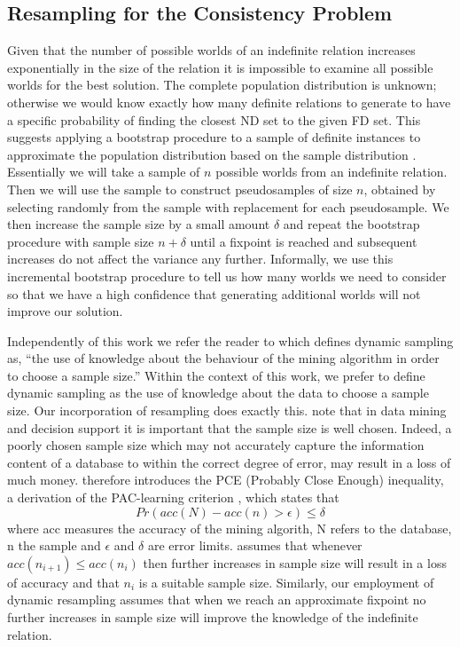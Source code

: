 \subsection{Resampling for the Consistency Problem}

Given that the number of  possible worlds of an indefinite relation increases
exponentially in the size of the relation  it is impossible to
examine all possible worlds for the best solution.  The
complete population distribution is unknown; otherwise we would know 
exactly how many definite relations to
generate to have a specific probability of finding the closest ND set
to the given FD set.  This suggests 
applying a bootstrap procedure to a sample of definite instances 
to approximate the population distribution based on the sample
distribution \cite{et86}.  Essentially we will take a sample of
$n$ possible
worlds from an indefinite relation. Then we will use the sample
to construct pseudosamples of size $n$, obtained by selecting
randomly from the sample with replacement for each pseudosample. 
We then increase the sample size by a small amount $\delta$ and repeat
the bootstrap procedure with sample size $n + \delta$ until a fixpoint
is reached and subsequent increases do not affect the variance any further.
Informally, we use this incremental
bootstrap procedure to tell us how many worlds we need 
to consider so that we have a high confidence that generating additional
worlds will not improve our solution.

\medskip

Independently of this work we refer the reader to \cite{jl96} which
defines dynamic sampling as, ``the use of knowledge about the
behaviour of the mining algorithm in order to choose a sample size.''
Within the context of this work, we prefer to define dynamic sampling
as the use of knowledge about the data to choose a sample size. Our
incorporation of resampling does exactly this.
\cite{jl96} note that in data mining and decision support it is
important that the sample size is well chosen.  Indeed, a poorly
chosen sample size which may not accurately capture the information
content of a database to within the correct degree of error, may
result in a loss of much money. \cite{jl96} therefore introduces the
PCE (Probably Close Enough) inequality, a derivation of the
PAC-learning criterion \cite{val84,ab92}, which states that
\[
Pr(acc(N) - acc(n) > \epsilon) \le \delta
\]
where acc measures the accuracy of the mining algorith, N refers to
the database, n the sample and $\epsilon$ and $\delta$ are error
limits. \cite{jl96} assumes that whenever $acc(n_{i+1}) \le acc(n_i)$
then further increases in sample size will result in a loss of
accuracy and that $n_i$ is a suitable sample size. Similarly, our
employment of dynamic resampling assumes that when we reach an
approximate fixpoint no further increases in sample size will improve
the knowledge of the indefinite relation. 

